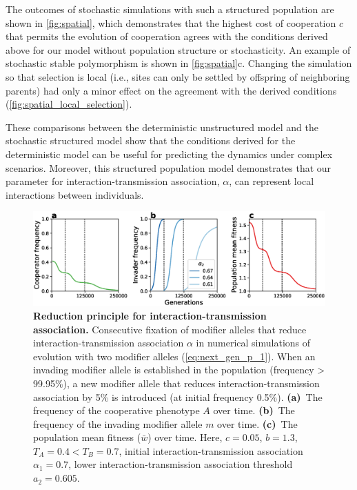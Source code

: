 \documentclass[12pt]{extarticle}
\begin{document}
The outcomes of stochastic simulations with such a structured population are shown in \autoref{fig:spatial}, which demonstrates that the highest cost of cooperation $c$ that permits the evolution of cooperation agrees with the conditions derived above for our model without population structure or stochasticity.
An example of stochastic stable polymorphism is shown in \autoref{fig:spatial}c.
Changing the simulation so that selection is local (i.e., sites can only be settled by offspring of neighboring parents) had only a minor effect on the agreement with the derived conditions (\autoref{fig:spatial_local_selection}).

These comparisons between the deterministic unstructured model and the stochastic structured model show that the conditions derived for the deterministic model can be useful for predicting the dynamics under complex scenarios. 
Moreover, this structured population model demonstrates that our parameter for interaction-transmission association, $\alpha$, can represent local interactions between individuals.

\begin{figure}[h]
  \centering
   \includegraphics[scale=0.5]{../Figures/invasion.eps}
  \caption{
  \textbf{Reduction principle for interaction-transmission association.} 
  Consecutive fixation of modifier alleles that reduce interaction-transmission association $\alpha$ in numerical simulations of evolution with two modifier alleles (\autoref{eq:next_gen_p_1}).
  When an invading modifier allele is established in the population (frequency > 99.95\%), a new modifier allele that reduces interaction-transmission association by 5\% is introduced (at initial frequency 0.5\%).
  \textbf{(a)}~The frequency of the cooperative phenotype $A$ over time.
  \textbf{(b)}~The frequency of the invading modifier allele $m$ over time. 
  \textbf{(c)}~The population mean fitness ($\bar{w}$) over time.
  Here, $c = 0.05$, $b=1.3$, $T_A=0.4<T_B=0.7$, initial interaction-transmission association $\alpha_1=0.7$, lower interaction-transmission association threshold $a_2=0.605$.  
  }
  \label{fig:invasion}
\end{figure}
\end{document}

